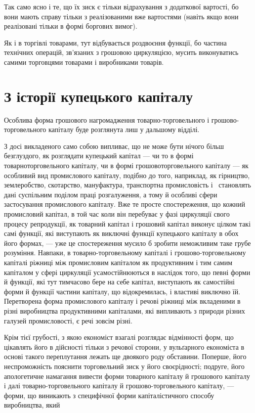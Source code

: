 
Так само ясно і те, що їх зиск є тільки відрахування з додаткової
вартості, бо вони мають справу тільки з реалізованими
вже вартостями (навіть якщо вони реалізовані тільки в формі
боргових вимог).

Як і в торгівлі товарами, тут відбувається роздвоєння функції,
бо частина технічних операцій, зв’язаних з грошовою циркуляцією,
мусить виконуватись самими торговцями товарами
і виробниками товарів.

\section{З історії купецького капіталу}

Особлива форма грошового нагромадження товарно-торговельного
і грошово-торговельного капіталу буде розглянута лиш у
дальшому відділі.

З досі викладеного само собою випливає, що не може бути
нічого більш безглуздого, як розглядати купецький капітал —
чи то в формі товарно\dash{}торговельного капіталу, чи в формі грошово\dash{}торговельного
капіталу — як особливий вид промислового
капіталу, подібно до того, наприклад, як гірництво, землеробство,
скотарство, мануфактура, транспортна промисловість і~
становлять дані суспільним поділом праці розгалуження, а тому й
особливі сфери застосування промислового капіталу. Вже те
просте спостереження, що кожний промисловий капітал, в той час
коли він перебуває у фазі циркуляції свого процесу репродукції,
як товарний капітал і грошовий капітал виконує цілком такі
самі функції, які виступають як виключні функції купецького
капіталу в обох його формах, — уже це спостереження мусило б
зробити неможливим таке грубе розуміння. Навпаки, в товарно-торговельному
капіталі і грошово-торговельному капіталі ріжниці
між промисловим капіталом як продуктивним і тим самим
капіталом у сфері циркуляції усамостійнюються в наслідок того,
що певні форми й функції, які тут тимчасово бере на себе капітал,
виступають як самостійні форми й функції частини капіталу,
що відокремилась, і властиві виключно їй. Перетворена форма
промислового капіталу і речові ріжниці між вкладеними в різні
виробництва продуктивними капіталами, які випливають з природи
різних галузей промисловості, є речі зовсім різні.

Крім тієї грубості, з якою економіст взагалі розглядає відмінності
форм, що цікавлять його в дійсності тільки з речової сторони,
у вульґарного економіста в основі такого переплутання
лежать ще двоякого роду обставини. Поперше, його неспроможність
пояснити торговельний зиск у його своєрідності; подруге,
його апологетичне намагання вивести форми товарного капіталу
й грошового капіталу і далі товарно-торговельного капіталу й
грошово-торговельного капіталу, — форми, що виникають з специфічної
форми капіталістичного способу виробництва, який
\parbreak{}  %
